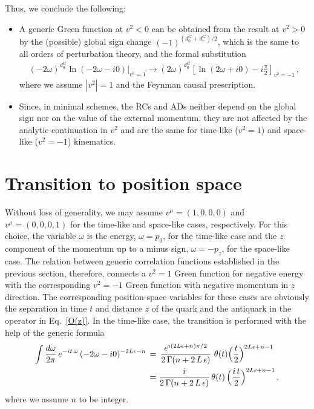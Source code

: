 \documentclass[12pt]{article}
\numberwithin{equation}{section}
\newcommand{\1}[1]{\mathbf{1}^{#1}}
\newcommand{\2}[1]{\mathbf{2}^{#1}}
\newcommand{\3}[1]{\mathbf{3}^{#1}}
\newcommand{\4}[1]{\mathbf{4}^{#1}}
\newcommand{\5}[1]{\mathbf{5}^{#1}}
\newcommand{\EQN}[1]{\hspace{3mm}\fbox{\fbox{$#1$}} \label{#1}}
\newcommand{\mlabel}[1]{ \text{\footnotesize \hspace{3mm}\fbox{\fbox{$#1$}} \label{#1}}}
\renewcommand{\EQN}[1]{\mlabel{#1}}
\renewcommand{\mlabel}[1]{\label{#1}}
\renewcommand{\EQN}[1]{\label{#1}}
\newcommand{\nnb}{\nonumber}
\newcommand{\ep}{\epsilon}
\newcommand{\eqs}[1]{\begin{align}#1\end{align}}
\newcommand{\Ga}{\Gamma}
\newcommand{\om}{\omega}
\newcommand{\vv}{v^2}
\begin{document}
Thus, we conclude the following:
\begin{itemize}
\item
 A generic Green function at $\vv <0$ can be obtained from the result at $\vv>0$
 by the (possible) global sign change $(-1)^{(d_0^G+d^G_v)/2}$,
which is the same to all orders of perturbation theory,
and the formal substitution 
\begin{align}
  (-2\omega)^{d_0^G}\ln (-2\omega-i0)|_{\vv=1} \to (2\omega)^{d_0^G}
  \left[\ln (2\omega +i0) -  i\frac{\pi}{2}\right]_{\vv=-1}
\,,
\mlabel{t->s}
\end{align}
where we assume $|\vv|=1$ and the Feynman causal prescription.
\item
Since, in minimal schemes, the RCs and ADs neither depend on  the global sign nor on the value of the external momentum, 
 they are not affected by the analytic continuation in $\vv$ and are the same for time-like ($\vv =1$) and space-like ($\vv=-1$) kinematics.
\end{itemize}
\section{Transition to  position space}
\label{sec:four}
Without loss of generality, we may assume $v^\mu = (1,0,0,0)$ and $v^\mu = (0,0,0,1)$ for the time-like and space-like
cases, respectively. For this choice, the variable $\omega$ is the energy, $\omega = p_0$, for the
time-like case and the $z$ component of the momentum up to a minus sign, $\omega = - p_z$, for the space-like case.
The relation between generic correlation functions established in the previous section, therefore, 
connects a $v^2=1$ Green function for negative energy with the corresponding $v^2=-1$ Green function with negative
momentum in $z$ direction. 
The corresponding position-space variables for these cases are obviously the
separation in time $t$ and distance $z$ of the quark and the antiquark in the operator in Eq.~\eqref{O(z)}.     
In the time-like case, the transition is performed with the  help of the generic formula
\eqs{
\int \frac{d \om }{2\pi}\,  e^{-it\, \om } \, (-2\omega  - i0)^{-2L\ep  -n }
\, &=\,
\frac{e^{i (2 L\ep +n) \pi/2}}{2\,\Ga(n + 2\, L\,\ep)}\,\,\theta(t)\Bigl(\frac{t}{2}\Bigr)^{2 L \ep +n-1}
\nnb
\\
&=
\frac{i}{2\,\Ga(n  + 2\, L\,\ep)}\,\theta(t)\,\Bigl(\frac{i\,t}{2}\Bigr) ^{2 L \ep +n-1}
\,,
\EQN{x:t}
}
where we assume $n$ to be integer.
 
\end{document}
